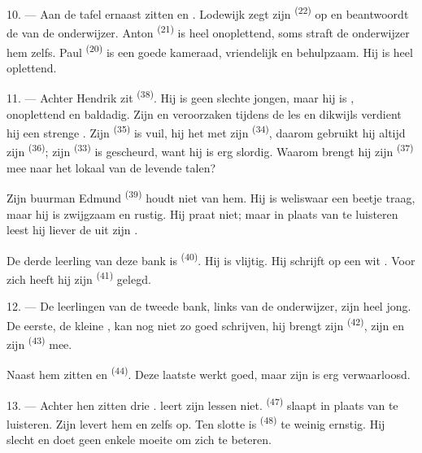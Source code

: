 10. --- Aan de tafel ernaast zitten  en . Lodewijk zegt
zijn  \textsuperscript{(22)} op en beantwoordt de
 van de onderwijzer. Anton \textsuperscript{(21)} is heel
onoplettend, soms straft de onderwijzer hem zelfs. Paul \textsuperscript{(20)} is een goede
kameraad, vriendelijk en behulpzaam. Hij is heel oplettend.

\VUsaut{4.2mm}
\VUsaut{3.2mm}

11. --- Achter Hendrik zit  \textsuperscript{(38)}. Hij is geen slechte jongen,
maar hij is , onoplettend en baldadig. Zijn
 en  veroorzaken
 tijdens de les en dikwijls verdient hij een strenge
. Zijn  \textsuperscript{(35)} is
vuil, hij  het  met zijn  \textsuperscript{(34)},
daarom gebruikt hij altijd zijn  \textsuperscript{(36)}; zijn
 \textsuperscript{(33)} is gescheurd, want hij is erg slordig. Waarom
brengt hij zijn
 \textsuperscript{(37)} mee naar het lokaal van de
levende talen?

Zijn buurman Edmund \textsuperscript{(39)} houdt niet van hem. Hij is weliswaar een beetje
traag, maar hij is zwijgzaam en rustig. Hij praat niet; maar in plaats van te luisteren leest
hij liever de  uit zijn
.

De derde leerling van deze bank is  \textsuperscript{(40)}. Hij is vlijtig.
Hij schrijft op een wit . Voor zich heeft hij zijn 
\textsuperscript{(41)} gelegd.

12. --- De leerlingen van de tweede bank, links van de onderwijzer, zijn heel jong. De eerste,
de kleine , kan nog niet zo goed schrijven, hij brengt zijn 
\textsuperscript{(42)}, zijn  en zijn
 \textsuperscript{(43)} mee.

Naast hem zitten  en  \textsuperscript{(44)}. Deze laatste
werkt goed, maar zijn  is erg verwaarloosd.

13. --- Achter hen zitten drie .  leert zijn lessen niet.
 \textsuperscript{(47)} slaapt in plaats van te luisteren. Zijn 
levert hem  en zelfs
 op. Ten slotte is 
\textsuperscript{(48)} te weinig ernstig. Hij  slecht en doet geen
enkele moeite om zich te beteren.


